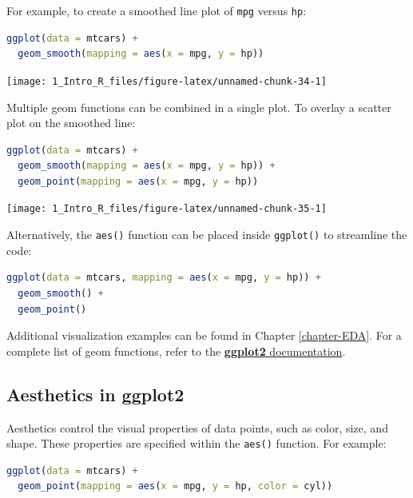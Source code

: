 \documentclass[
  11pt,
]{book}
\newcommand{\passthrough}[1]{#1}
\theoremstyle{definition}
\theoremstyle{definition}
\theoremstyle{definition}
\theoremstyle{definition}
\theoremstyle{remark}
\begin{document}
For example, to create a smoothed line plot of \passthrough{\lstinline!mpg!} versus \passthrough{\lstinline!hp!}:

\begin{lstlisting}[language=R]
ggplot(data = mtcars) +
  geom_smooth(mapping = aes(x = mpg, y = hp))
\end{lstlisting}

\begin{center}\texttt{[image: 1\_Intro\_R\_files/figure-latex/unnamed-chunk-34-1]} \end{center}

Multiple geom functions can be combined in a single plot. To overlay a scatter plot on the smoothed line:

\begin{lstlisting}[language=R]
ggplot(data = mtcars) +
  geom_smooth(mapping = aes(x = mpg, y = hp)) + 
  geom_point(mapping = aes(x = mpg, y = hp))
\end{lstlisting}

\begin{center}\texttt{[image: 1\_Intro\_R\_files/figure-latex/unnamed-chunk-35-1]} \end{center}

Alternatively, the \passthrough{\lstinline!aes()!} function can be placed inside \passthrough{\lstinline!ggplot()!} to streamline the code:

\begin{lstlisting}[language=R]
ggplot(data = mtcars, mapping = aes(x = mpg, y = hp)) +
  geom_smooth() + 
  geom_point()
\end{lstlisting}

Additional visualization examples can be found in Chapter \ref{chapter-EDA}. For a complete list of geom functions, refer to the \href{https://ggplot2.tidyverse.org}{\textbf{ggplot2} documentation}.

\subsection*{Aesthetics in ggplot2}\label{aesthetics-in-ggplot2}


Aesthetics control the visual properties of data points, such as color, size, and shape. These properties are specified within the \passthrough{\lstinline!aes()!} function. For example:

\begin{lstlisting}[language=R]
ggplot(data = mtcars) +
  geom_point(mapping = aes(x = mpg, y = hp, color = cyl))
\end{lstlisting}
\end{document}
